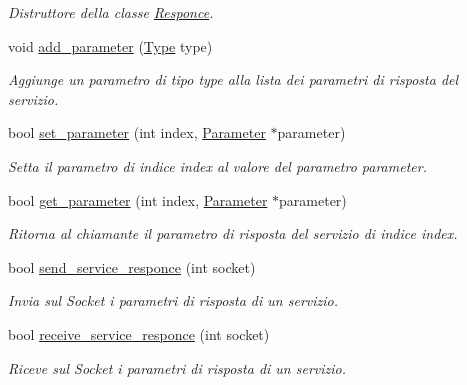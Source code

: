 \begin{DoxyCompactItemize}
\begin{DoxyCompactList}\small\item\em Distruttore della classe {\ttfamily \hyperlink{class_responce}{Responce}}. \end{DoxyCompactList}\item 
void \hyperlink{class_responce_a3e017879279c806c8464ce5b80fbc2bb}{add\-\_\-parameter} (\hyperlink{_types_8h_a1d1cfd8ffb84e947f82999c682b666a7}{Type} type)
\begin{DoxyCompactList}\small\item\em Aggiunge un parametro di tipo {\itshape type} alla lista dei parametri di risposta del servizio. \end{DoxyCompactList}\item 
bool \hyperlink{class_responce_a4aae649830ede3a72a3a51b80127e0a7}{set\-\_\-parameter} (int index, \hyperlink{struct_parameter}{Parameter} $\ast$parameter)
\begin{DoxyCompactList}\small\item\em Setta il parametro di indice {\ttfamily index} al valore del parametro {\ttfamily parameter}. \end{DoxyCompactList}\item 
bool \hyperlink{class_responce_a194e896972517e27a18c5177e553612d}{get\-\_\-parameter} (int index, \hyperlink{struct_parameter}{Parameter} $\ast$parameter)
\begin{DoxyCompactList}\small\item\em Ritorna al chiamante il parametro di risposta del servizio di indice {\ttfamily index}. \end{DoxyCompactList}\item 
bool \hyperlink{class_responce_a9c9b1966b01d4bbb57ec2cd4973e9d03}{send\-\_\-service\-\_\-responce} (int socket)
\begin{DoxyCompactList}\small\item\em Invia sul {\itshape Socket} i parametri di risposta di un servizio. \end{DoxyCompactList}\item 
bool \hyperlink{class_responce_aafc0e0434609dc7a030315b7a7acfa81}{receive\-\_\-service\-\_\-responce} (int socket)
\begin{DoxyCompactList}\small\item\em Riceve sul {\itshape Socket} i parametri di risposta di un servizio. \end{DoxyCompactList}\end{DoxyCompactItemize}
